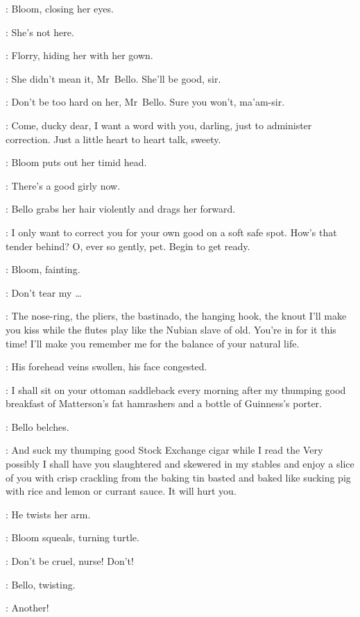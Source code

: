 :
Bloom, closing her eyes.

\Bloom:
She's not here.

:
Florry, hiding her with her gown.

\Florry:
She didn't mean it, Mr~Bello.
She'll be good, sir.

\Kitty:
Don't be too hard on her, Mr~Bello.
Sure you won't, ma'am-sir.

\Bello:
Come, ducky dear, I want a word with you, darling,
just to administer correction.
Just a little heart to heart talk, sweety.

:
Bloom puts out her timid head.

\Bello:
There's a good girly now.

:
Bello grabs her hair violently and drags her forward.

\Bello:
I only want to correct you for your own good on a soft safe spot.
How's that tender behind?
O, ever so gently, pet.
Begin to get ready.

:
Bloom, fainting.

\Bloom:
Don't tear my \ldots

\Bello:
The nose-ring, the pliers, the bastinado, the hanging hook,
the knout I'll make you kiss while the flutes play like the Nubian slave of old.
You're in for it this time!
I'll make you remember me for the balance of your natural life.

:
His forehead veins swollen, his face congested.

\Bello:
I shall sit on your ottoman saddleback every morning after
my thumping good breakfast of Matterson's fat hamrashers
and a bottle of Guinness's porter.

:
Bello belches.

\Bello:
And suck my thumping good Stock Exchange cigar
while I read the 
Very possibly I shall have you slaughtered and skewered in my stables
and enjoy a slice of you with crisp crackling from the baking tin
basted and baked like sucking pig with rice and lemon or currant sauce.
It will hurt you.

:
He twists her arm.

:
Bloom squeals, turning turtle.

\Bloom:
Don't be cruel, nurse!
Don't!

:
Bello, twisting.

\Bello:
Another!

